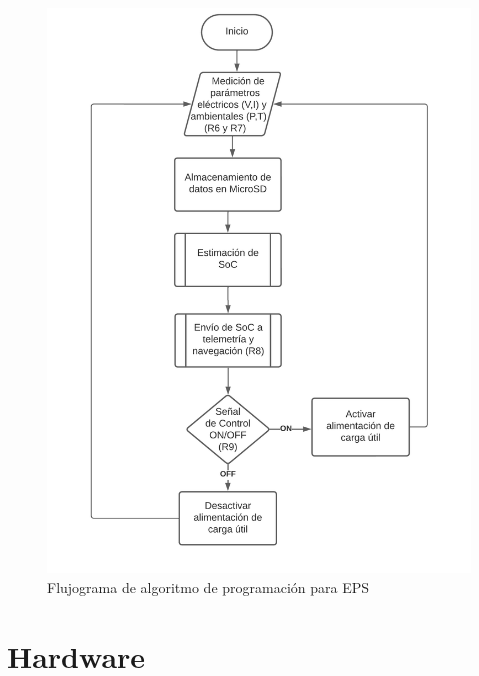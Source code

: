 \begin{figure}[h]
  \centering
  \includegraphics[width=\textwidth]{Pictures/Flujograma_EPS.png}
  \caption{Flujograma de algoritmo de programación para EPS}
  \label{fig:flujograma_EPS}
\end{figure}

\newpage





\section{Hardware}

